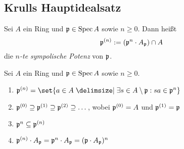 \documentclass[12pt,a4paper]{scrartcl}
\theoremstyle{cplain}
\theoremstyle{cdef}
\begin{document}
\subsection{Krulls Hauptidealsatz}
\begin{defi}
	Sei $A$ ein Ring und $\mathfrak{p}\in\operatorname{Spec} A$ sowie $n\ge 0$. Dann heißt
	\[\mathfrak{p}^{(n)} := (\mathfrak{p}^n\cdot A_{\mathfrak{p}})\cap A\]
	die \emph{$n$-te sympolische Potenz} von $\mathfrak{p}$.
\end{defi}
\begin{lem} \label{lem:9.9}
	Sei $A$ ein Ring und $\mathfrak{p}\in\operatorname{Spec} A$ sowie $n\ge 0$.
	\begin{enumerate}
		\item $\fp^{(n)} = \set{ a\in A\given \exists s\in A\setminus \fp: sa \in \fp ^n}$ \label{lem:9.9:i}
		\item $\mathfrak{p}^{(0)}\supseteq \mathfrak{p}^{(1)}\supseteq \mathfrak{p}^{(2)}\supseteq \dots$, wobei $\mathfrak{p}^{(0)} = A$ und $\mathfrak{p}^{(1)} = \mathfrak{p}$ \label{lem:9.9:ii}
		\item $\mathfrak{p}^n \subseteq \mathfrak{p}^{(n)}$ \label{lem:9.9:iii}
		\item $\mathfrak{p}^{(n)}\cdot A_{\mathfrak{p}} = \mathfrak{p}^n\cdot A_{\mathfrak{p}} = (\mathfrak{p}\cdot A_{\mathfrak{p}})^n$ \label{lem:9.9:iv}
	\end{enumerate}
\end{lem}
\end{document}
